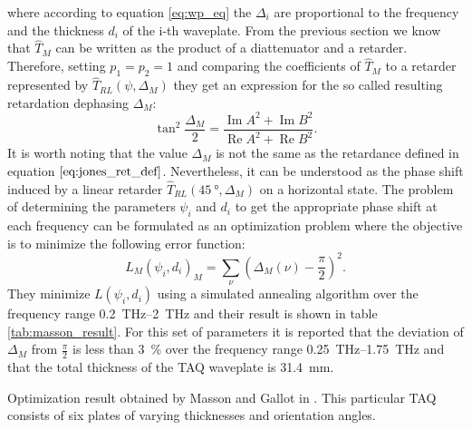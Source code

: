 where according to equation \ref{eq:wp_eq} the $\Delta_i$ are proportional to the frequency and the thickness $d_i$ of the i-th waveplate. From the previous section we know that $\hat{T}_M$ can be written as the product of a diattenuator and a retarder. Therefore, setting $p_1=p_2=1$ and comparing the coefficients of $\hat{T}_{M}$ to a retarder represented by $\hat{T}_{RL}(\psi, \Delta_M)$ they get an expression for the so called resulting retardation dephasing $\Delta_M$:
\begin{equation}
    \tan^2 \frac{\Delta_M}{2} = \frac{\operatorname{Im}A^2+\operatorname{Im}B^2}
    {\operatorname{Re}A^2+\operatorname{Re}B^2}.
\end{equation}
It is worth noting that the value $\Delta_M$ is not the same as the retardance defined in equation $\ref{eq:jones_ret_def}$. Nevertheless, it can be understood as the phase shift induced by a linear retarder $\hat{T}_{RL}(\SI{45}{\degree}, \Delta_M)$ on a horizontal state. The problem of determining the parameters $\psi_i$ and $d_i$ to get the appropriate phase shift at each frequency can be formulated as an optimization problem where the objective is to minimize the following error function:
\begin{equation}
    \label{eq:mass_loss}
    L_M(\psi_i, d_i)_M=\sum_{\nu}\left(\Delta_M(\nu)-\frac{\pi}{2}\right)^2.
\end{equation}
They minimize $L(\psi_i, d_i)$ using a simulated annealing algorithm over the frequency range \SIrange{0.2}{2}{\tera \hertz} and their result is shown in table \ref{tab:masson_result}. For this set of parameters it is reported that the deviation of $\Delta_M$ from $\frac{\pi}{2}$ is less than \SI{3}{\percent} over the frequency range \SIrange{0.25}{1.75}{\tera \hertz} and that the total thickness of the TAQ waveplate is \SI{31.4}{\milli \meter}. 

\begin{table}[h]
    \centering
    
    \caption{Optimization result obtained by Masson and Gallot in \cite{Masson2006TerahertzJean-Baptiste}. This particular TAQ consists of six plates of varying thicknesses and orientation angles.}
    \label{tab:masson_result}
\end{table}

